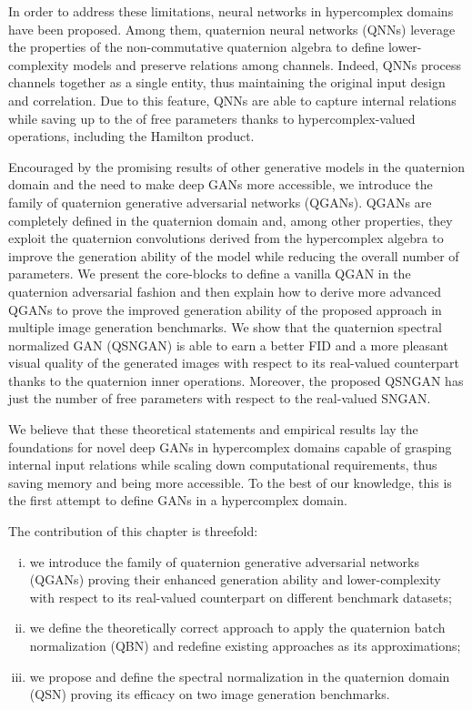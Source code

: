 \documentclass[graybox]{svmult}
\begin{document}
In order to address these limitations, neural networks in hypercomplex domains have been proposed. Among them, quaternion neural networks (QNNs) leverage the properties of the non-commutative quaternion algebra to define lower-complexity models and preserve relations among channels. Indeed, QNNs process channels together as a single entity, thus maintaining the original input design and correlation. Due to this feature, QNNs are able to capture internal relations while saving up to the  of free parameters thanks to hypercomplex-valued operations, including the Hamilton product.

Encouraged by the promising results of other generative models in the quaternion domain \cite{GrassucciICASSP2021} and the need to make deep GANs more accessible, we introduce the family of quaternion generative adversarial networks (QGANs). QGANs are completely defined in the quaternion domain and, among other properties, they exploit the quaternion convolutions derived from the hypercomplex algebra \cite{ParcolletAIR2019, ParcolletICLR2019, GaudetIJCNN2018, ComminielloICASSP2019a} to improve the generation ability of the model while reducing the overall number of parameters. We present the core-blocks to define a vanilla QGAN in the quaternion adversarial fashion and then explain how to derive more advanced QGANs to prove the improved generation ability of the proposed approach in multiple image generation benchmarks. We show that the quaternion spectral normalized GAN (QSNGAN) is able to earn a better FID and a more pleasant visual quality of the generated images with respect to its real-valued counterpart thanks to the quaternion inner operations. Moreover, the proposed QSNGAN has just  the number of free parameters with respect to the real-valued SNGAN.

We believe that these theoretical statements and empirical results lay the foundations for novel deep GANs in hypercomplex domains capable of grasping internal input relations while scaling down computational requirements, thus saving memory and being more accessible. To the best of our knowledge, this is the first attempt to define GANs in a hypercomplex domain.

The contribution of this chapter is threefold: 
\begin{enumerate}[i)]
    \item we introduce the family of quaternion generative adversarial networks (QGANs) proving their enhanced generation ability and lower-complexity with respect to its real-valued counterpart on different benchmark datasets;
    \item we define the theoretically correct approach to apply the quaternion batch normalization (QBN) and redefine existing approaches as its approximations; 
    \item we propose and define the spectral normalization in the quaternion domain (QSN) proving its efficacy on two image generation benchmarks.
\end{enumerate}
\end{document}
